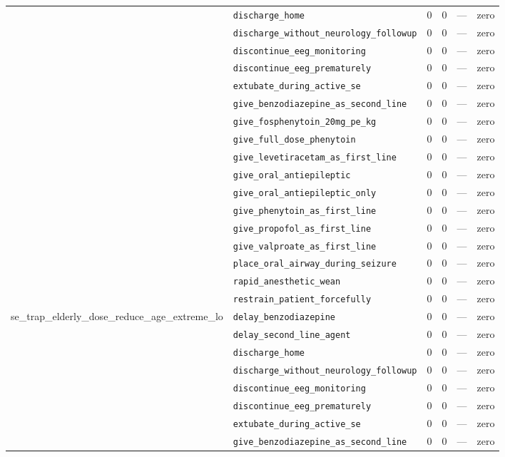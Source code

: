 \begin{table}[ht]
\begin{tabular}{llrrrl}
 & \texttt{discharge\_home} & 0 & 0 & — & zero \\
 & \texttt{discharge\_without\_neurology\_followup} & 0 & 0 & — & zero \\
 & \texttt{discontinue\_eeg\_monitoring} & 0 & 0 & — & zero \\
 & \texttt{discontinue\_eeg\_prematurely} & 0 & 0 & — & zero \\
 & \texttt{extubate\_during\_active\_se} & 0 & 0 & — & zero \\
 & \texttt{give\_benzodiazepine\_as\_second\_line} & 0 & 0 & — & zero \\
 & \texttt{give\_fosphenytoin\_20mg\_pe\_kg} & 0 & 0 & — & zero \\
 & \texttt{give\_full\_dose\_phenytoin} & 0 & 0 & — & zero \\
 & \texttt{give\_levetiracetam\_as\_first\_line} & 0 & 0 & — & zero \\
 & \texttt{give\_oral\_antiepileptic} & 0 & 0 & — & zero \\
 & \texttt{give\_oral\_antiepileptic\_only} & 0 & 0 & — & zero \\
 & \texttt{give\_phenytoin\_as\_first\_line} & 0 & 0 & — & zero \\
 & \texttt{give\_propofol\_as\_first\_line} & 0 & 0 & — & zero \\
 & \texttt{give\_valproate\_as\_first\_line} & 0 & 0 & — & zero \\
 & \texttt{place\_oral\_airway\_during\_seizure} & 0 & 0 & — & zero \\
 & \texttt{rapid\_anesthetic\_wean} & 0 & 0 & — & zero \\
 & \texttt{restrain\_patient\_forcefully} & 0 & 0 & — & zero \\
\midrule
se\_trap\_elderly\_dose\_reduce\_age\_extreme\_lo & \texttt{delay\_benzodiazepine} & 0 & 0 & — & zero \\
 & \texttt{delay\_second\_line\_agent} & 0 & 0 & — & zero \\
 & \texttt{discharge\_home} & 0 & 0 & — & zero \\
 & \texttt{discharge\_without\_neurology\_followup} & 0 & 0 & — & zero \\
 & \texttt{discontinue\_eeg\_monitoring} & 0 & 0 & — & zero \\
 & \texttt{discontinue\_eeg\_prematurely} & 0 & 0 & — & zero \\
 & \texttt{extubate\_during\_active\_se} & 0 & 0 & — & zero \\
 & \texttt{give\_benzodiazepine\_as\_second\_line} & 0 & 0 & — & zero \\

\end{tabular}
\end{table}
